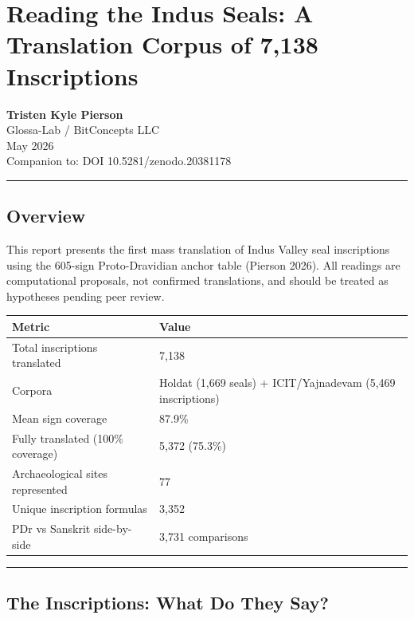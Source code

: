 \documentclass[
  11pt,
]{article}
\author{}
\date{}
\newcounter{none} %
\begin{document}
\section{Reading the Indus Seals: A Translation Corpus of 7,138
Inscriptions}\label{reading-the-indus-seals-a-translation-corpus-of-7138-inscriptions}

\textbf{Tristen Kyle Pierson}\\
Glossa-Lab / BitConcepts LLC\\
May 2026\\
Companion to: DOI 10.5281/zenodo.20381178

\begin{center}\rule{0.5\linewidth}{0.5pt}\end{center}

\subsection{Overview}\label{overview}

This report presents the first mass translation of Indus Valley seal
inscriptions using the 605-sign Proto-Dravidian anchor table (Pierson
2026). All readings are computational proposals, not confirmed
translations, and should be treated as hypotheses pending peer review.

{\def\LTcaptype{none} %
\begin{longtable}[]{@{}ll@{}}
\toprule\noalign{}
Metric & Value \\
\midrule\noalign{}
\endhead
\bottomrule\noalign{}
\endlastfoot
Total inscriptions translated & 7,138 \\
Corpora & Holdat (1,669 seals) + ICIT/Yajnadevam (5,469 inscriptions) \\
Mean sign coverage & 87.9\% \\
Fully translated (100\% coverage) & 5,372 (75.3\%) \\
Archaeological sites represented & 77 \\
Unique inscription formulas & 3,352 \\
PDr vs Sanskrit side-by-side & 3,731 comparisons \\
\end{longtable}
}

\begin{center}\rule{0.5\linewidth}{0.5pt}\end{center}

\subsection{The Inscriptions: What Do They
Say?}\label{the-inscriptions-what-do-they-say}
\end{document}
